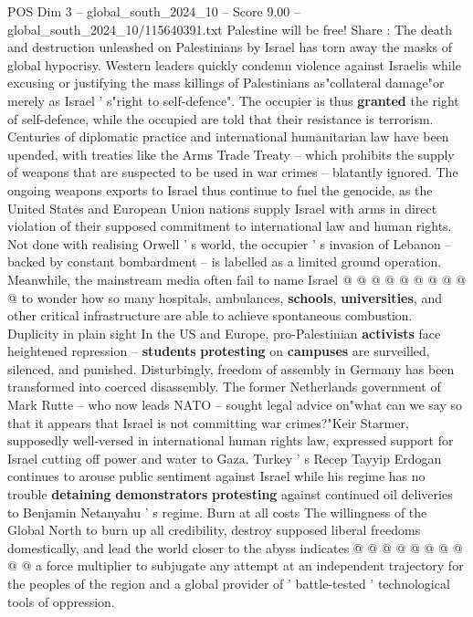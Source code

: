 \begin{textsample}{POS Dim 3 – global\_south\_2024\_10 – Score 9.00 – global\_south\_2024\_10/115640391.txt}  \label{ex:f3_pos_402}
Palestine will be free!
Share : The death and destruction unleashed on Palestinians by Israel has torn away the masks of global hypocrisy.
Western leaders quickly condemn violence against Israelis while excusing or justifying the mass killings of Palestinians as"collateral damage"or merely as Israel ' s"right to self-defence".
The occupier is thus \textbf{granted} the right of self-defence, while the occupied are told that their resistance is terrorism.
Centuries of diplomatic practice and international humanitarian law have been upended, with treaties like the Arms Trade Treaty -- which prohibits the supply of weapons that are suspected to be used in war crimes -- blatantly ignored.
The ongoing weapons exports to Israel thus continue to fuel the genocide, as the United States and European Union nations supply Israel with arms in direct violation of their supposed commitment to international law and human rights.
Not done with realising Orwell ' s world, the occupier ' s invasion of Lebanon -- backed by constant bombardment -- is labelled as a limited ground operation.
Meanwhile, the mainstream media often fail to name Israel @ @ @ @ @ @ @ @ @ @ to wonder how so many hospitals, ambulances, \textbf{schools}, \textbf{universities}, and other critical infrastructure are able to achieve spontaneous combustion.
Duplicity in plain sight In the US and Europe, pro-Palestinian \textbf{activists} face heightened repression -- \textbf{students} \textbf{protesting} on \textbf{campuses} are surveilled, silenced, and punished.
Disturbingly, freedom of assembly in Germany has been transformed into coerced disassembly.
The former Netherlands government of Mark Rutte -- who now leads NATO -- sought legal advice on"what can we say so that it appears that Israel is not committing war crimes?"Keir Starmer, supposedly well-versed in international human rights law, expressed support for Israel cutting off power and water to Gaza.
Turkey ' s Recep Tayyip Erdogan continues to arouse public sentiment against Israel while his regime has no trouble \textbf{detaining} \textbf{demonstrators} \textbf{protesting} against continued oil deliveries to Benjamin Netanyahu ' s regime.
Burn at all costs The willingness of the Global North to burn up all credibility, destroy supposed liberal freedoms domestically, and lead the world closer to the abyss indicates @ @ @ @ @ @ @ @ @ @ a force multiplier to subjugate any attempt at an independent trajectory for the peoples of the region and a global provider of ' battle-tested ' technological tools of oppression.

\end{textsample}
